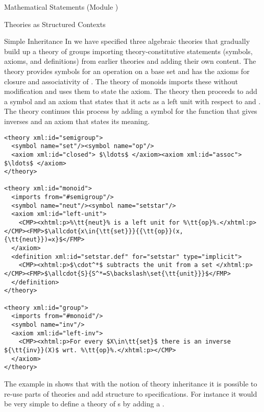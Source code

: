 \begin{tchapter}[id=statements,short=Mathematical Statements]{Mathematical Statements (Module {})}
\begin{tsection}[id=theories]{Theories as Structured Contexts}
\begin{tsubsection}[id=inheritance]{Simple Inheritance}
In {} we have specified three algebraic theories that gradually build
up a theory of groups importing theory-constitutive statements (symbols, axioms, and
definitions) from earlier theories and adding their own content. The theory
{} provides symbols for an operation {} on a base set
{} and has the axioms for closure and associativity of
{}. The theory of monoids imports these without modification and uses them
to state the {} axiom. The theory {} then proceeds to
add a symbol {} and an axiom that states that it acts as a left unit with
respect to {} and {}.  The theory {}
continues this process by adding a symbol {} for the function that gives
inverses and an axiom that states its meaning.

\begin{lstlisting}[label=lst:def-group,escapechar=\%,mathescape,
  caption={A Structured Development of Algebraic Theories in {\omdoc}},
  index={theory,symbol,axiom,imports}]
<theory xml:id="semigroup">
  <symbol name="set"/><symbol name="op"/>
  <axiom xml:id="closed"> $\ldots$ </axiom><axiom xml:id="assoc"> $\ldots$ </axiom>
</theory>

<theory xml:id="monoid">
  <imports from="#semigroup"/>
  <symbol name="neut"/><symbol name="setstar"/>
  <axiom xml:id="left-unit">
    <CMP><xhtml:p>%\tt{neut}% is a left unit for %\tt{op}%.</xhtml:p></CMP><FMP>$\allcdot{x\in{\tt{set}}}{{\tt{op}}(x,{\tt{neut}})=x}$</FMP>
  </axiom>
  <definition xml:id="setstar.def" for="setstar" type="implicit">
    <CMP><xhtml:p>$\cdot^*$ subtracts the unit from a set </xhtml:p></CMP><FMP>$\allcdot{S}{S^*=S\backslash\set{\tt{unit}}}$</FMP>
  </definition>
</theory>

<theory xml:id="group"> 
  <imports from="#monoid"/>
  <symbol name="inv"/>
  <axiom xml:id="left-inv">
    <CMP><xhtml:p>For every $X\in\tt{set}$ there is an inverse ${\tt{inv}}(X)$ wrt. %\tt{op}%.</xhtml:p></CMP>
  </axiom>
</theory>
\end{lstlisting}

The example in {} shows that with the notion of theory inheritance it
is possible to re-use parts of theories and add structure to specifications. For instance
it would be very simple to define a theory of {s} by adding a
{}.


\end{tsubsection}
\end{tsection}
\end{tchapter}

